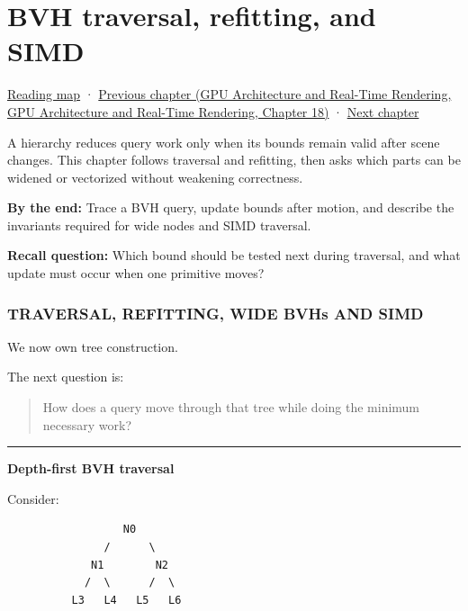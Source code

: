 \hypertarget{06-engine-ii-ch028}{}
\chapter{BVH traversal, refitting, and SIMD}\label{stagechapter:06-engine-ii-ch028}\label{06-engine-ii-ch028-bvh-traversal-refitting-and-simd}

\hyperref[volume-reading-map]{Reading map} · \href{../06-GPU-Architecture-and-Real-Time-Rendering/main.pdf\#nameddest=06-engine-ii-ch027-preparing-and-publishing-runtime-content}{Previous chapter (GPU Architecture and Real-Time Rendering, GPU Architecture and Real-Time Rendering, Chapter 18)} · \hyperref[06-engine-ii-ch029-dynamic-spatial-indices-for-moving-worlds]{Next chapter}

A hierarchy reduces query work only when its bounds remain valid after scene changes. This chapter follows traversal and refitting, then asks which parts can be widened or vectorized without weakening correctness.

\textbf{By the end:} Trace a BVH query, update bounds after motion, and describe the invariants required for wide nodes and SIMD traversal.

\textbf{Recall question:} Which bound should be tested next during traversal, and what update must occur when one primitive moves?

\subsection{TRAVERSAL, REFITTING, WIDE BVHs AND SIMD}\label{06-engine-ii-ch028-traversal-refitting-wide-bvhs-and-simd}

We now own tree construction.

The next question is:

\begin{quote}
How does a query move through that tree while doing the minimum necessary work?
\end{quote}

\begin{center}\rule{0.5\linewidth}{0.5pt}\end{center}

\textbf{Depth-first BVH traversal}

Consider:

\begin{verbatim}
                  N0
               /      \
             N1        N2
            /  \      /  \
          L3   L4   L5   L6
\end{verbatim}

